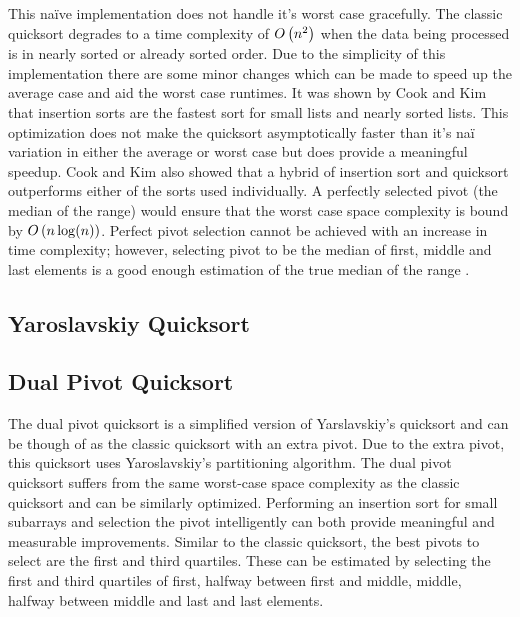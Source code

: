         This na\"{i}ve implementation does not handle it's worst case gracefully. The classic quicksort degrades to a time complexity of $O\left(n^2\right)$ when the data being processed is in nearly sorted or already sorted order. Due to the simplicity of this implementation there are some minor changes which can be made to speed up the average case and aid the worst case runtimes. It was shown by Cook and Kim \cite{cook1980best} that insertion sorts are the fastest sort for small lists and nearly sorted lists. This optimization does not make the quicksort asymptotically faster than it's na\"{i} variation in either the average or worst case but does provide a meaningful speedup. Cook and Kim also showed that a hybrid of insertion sort and quicksort outperforms either of the sorts used individually. A perfectly selected pivot (the median of the range) would ensure that the worst case space complexity is bound by $O\left(n\log(n)\right)$. Perfect pivot selection cannot be achieved with an increase in time complexity; however, selecting pivot to be the median of first, middle and last elements is a good enough estimation of the true median of the range \cite{sedgewick1978implementing}.

    \subsection{Yaroslavskiy Quicksort}    
        \label{subsec:YaroslavskiyQSortIntro}



	\subsection{Dual Pivot Quicksort}
		\label{subsec:DualPivotQSortIntro}

        The dual pivot quicksort is a simplified version of Yarslavskiy's quicksort and can be though of as the classic quicksort with an extra pivot. Due to the extra pivot, this quicksort uses Yaroslavskiy's partitioning algorithm. The dual pivot quicksort suffers from the same worst-case space complexity as the classic quicksort and can be similarly optimized. Performing an insertion sort for small subarrays and selection the pivot intelligently can both provide meaningful and measurable improvements. Similar to the classic quicksort, the best pivots to select are the first and third quartiles. These can be estimated by selecting the first and third quartiles of first, halfway between first and middle, middle, halfway between middle and last and last elements. 
	
